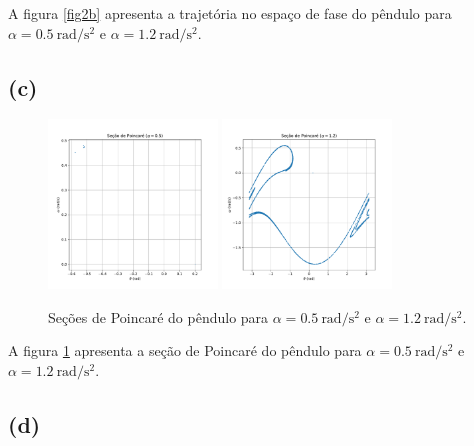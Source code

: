 \documentclass[a4paper, brazil]{article}
\begin{document}
A figura \ref{fig2b} apresenta a trajetória no espaço de fase do pêndulo para \( \alpha = \SI{0.5}{\radian\per\second\squared} \) e \( \alpha = \SI{1.2}{\radian\per\second\squared} \).

\subsection{(c)}

\begin{figure}[ht]
\centering
\includegraphics[width=0.4\textwidth]{fig2c1.pdf}
\includegraphics[width=0.4\textwidth]{fig2c2.pdf}
\caption{Seções de Poincaré do pêndulo para \( \alpha = \SI{0.5}{\radian\per\second\squared} \) e \( \alpha = \SI{1.2}{\radian\per\second\squared} \).}
\label{fig2c}
\end{figure}

A figura \ref{fig2c} apresenta a seção de Poincaré do pêndulo para \( \alpha = \SI{0.5}{\radian\per\second\squared} \) e \( \alpha = \SI{1.2}{\radian\per\second\squared} \).

\newpage
\subsection{(d)}
\end{document}

